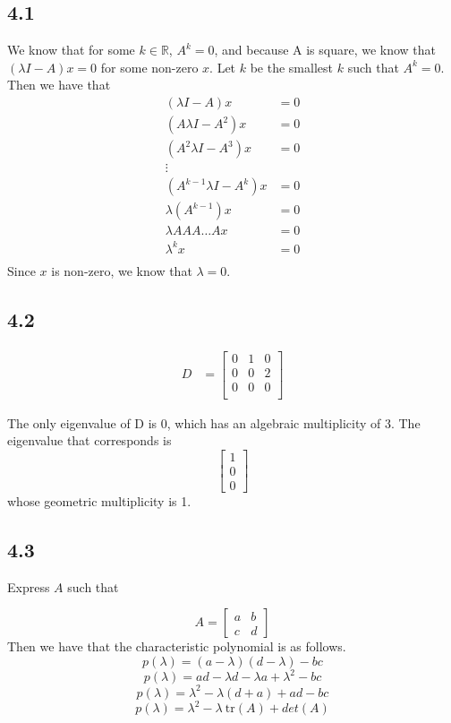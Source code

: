 \documentclass[letterpaper,12pt]{article}
\theoremstyle{definition}
\begin{document}
\subsection*{4.1}
We know that for some $k \in \mathbb{R}$, $A^k = 0$, and because A is square, we know that $(\lambda I - A)x = 0$ for some non-zero $x$. Let $k$ be the smallest $k$ such that $A^k = 0$. Then we have that
\begin{align*}
    (\lambda I - A)x &= 0\\
    (A\lambda I - A^2)x &= 0\\
    (A^2\lambda I - A^3)x &= 0\\
    \vdots\\
    (A^{k-1}\lambda I - A^k)  x &= 0\\
    \lambda (A^{k-1}) x &= 0\\
    \lambda AAA \dots Ax &= 0\\
    \lambda^k x &= 0\\
\end{align*}
Since $x$ is non-zero, we know that $\lambda=0$.
\subsection*{4.2}

\begin{align*}
    D &= 
\begin{bmatrix}
    0 & 1 & 0\\
    0 & 0 & 2\\
    0 & 0 & 0\\
\end{bmatrix}
\end{align*}

The only eigenvalue of D is $0$, which has an algebraic multiplicity of 3. The eigenvalue that corresponds is 
\[
\begin{bmatrix}

    1\\
    0\\
    0
    
\end{bmatrix}
\]
whose geometric multiplicity is 1.
\subsection*{4.3}

Express $A$ such that 

\[A =
\begin{bmatrix}
    a & b\\
    c & d
\end{bmatrix}\]
Then we have that the characteristic polynomial is as follows.
\[p(\lambda) = (a-\lambda)(d-\lambda) - bc\]
\[p(\lambda) = ad - \lambda d - \lambda a + \lambda^2 - bc\]
\[p(\lambda) = \lambda^2 - \lambda (d + a)+ ad - bc \]
\[p(\lambda) = \lambda^2 - \lambda ~\textrm{tr}(A) + det(A) \]
\end{document}
